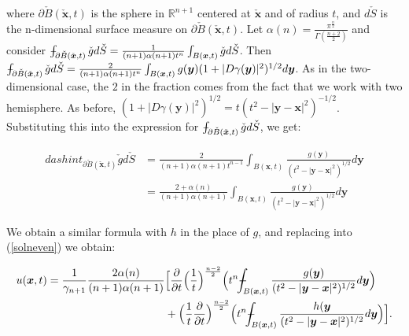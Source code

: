\documentclass[a4paper, 12pt]{article}
\def\Xint#1{\mathchoice
{\XXint\displaystyle\textstyle{#1}}%
{\XXint\textstyle\scriptstyle{#1}}%
{\XXint\scriptstyle\scriptscriptstyle{#1}}%
{\XXint\scriptscriptstyle\scriptscriptstyle{#1}}%
\!\int}
\def\XXint#1#2#3{{\setbox0=\hbox{$#1{#2#3}{\int}$ }
\vcenter{\hbox{$#2#3$ }}\kern-.6\wd0}}
\def\dashint{\Xint-}
\numberwithin{equation}{section}
\begin{document}
 where $\partial \check{B}(\boldsymbol{\check{x}},t)$ is the sphere in
 $\mathbb{R}^{n+1}$ centered at $\boldsymbol{\check{x}}$ and of radius $t$, and
 $d\check{S}$ is the n-dimensional surface measure on $\partial
 \check{B}(\boldsymbol{\check{x}},t)$. Let
 $\alpha(n)=\frac{\pi^{\frac{n}{2}}}{\Gamma(\frac{n+2}{2})}$ and consider
 $\dashint_{\partial \check{B}(\check{\boldsymbol{x}}, t)}
 \check{g}d\check{S}=\frac{1}{(n+1)\alpha(n+1)t^n}\int_{B(\boldsymbol{x},t)}\check{g}d\check{S}$.
 Then $\dashint_{\partial \check{B}(\check{\boldsymbol{x}}, t)}
 \check{g}d\check{S}=\frac{2}{(n+1)\alpha(n+1)t^n}\int_{B(\boldsymbol{x},t)}g(\boldsymbol{y})(1+|D\gamma(\boldsymbol{y})|^2)^{1/2}d\boldsymbol{y}$.
 As in the two-dimensional case, the $2$ in the fraction comes from the fact
 that we work with two hemisphere. As before, $(1+|D\gamma
 (\boldsymbol{y})|^2)^{1/2}=t(t^2-|\boldsymbol{y}-\boldsymbol{x}|^2)^{-1/2}$.
 Substituting this into the expression for $\dashint_{\partial
 \check{B}(\check{\boldsymbol{x}}, t)} \check{g}d\check{S}$, we get:

 \begin{equation*}
    \begin{aligned}
        dashint_{\partial \check{B}(\check{\boldsymbol{x}}, t)} \check{g}d\check{S}&=\frac{2}{(n+1)\alpha(n+1)t^{n-1}}\int_{B(\boldsymbol{x},t)}\frac{g(\boldsymbol{y})}{(t^2-|\boldsymbol{y}-\boldsymbol{x}|^2)^{1/2}}d\boldsymbol{y}\\
        &=\frac{2+\alpha(n)}{(n+1)\alpha(n+1)}\int_{B(\boldsymbol{x},t)}\frac{g(\boldsymbol{y})}{(t^2-|\boldsymbol{y}-\boldsymbol{x}|^2)^{1/2}}d \boldsymbol{y}
    \end{aligned}
\end{equation*}

We obtain a similar formula with $h$ in the place of $g$, and replacing into
(\ref{solneven}) we obtain:

\begin{equation*}
    \begin{split}
        u(\boldsymbol{x}, t)= \frac{1}{\gamma_{n+1}} \frac{2 \alpha(n)}{(n+1) \alpha (n+1)}&\Big[ \diffp[1]{}{t} \Big(\frac{1}{t} \Big)^{\frac{n-2}{2}} \Big(t^n \dashint_{B(\boldsymbol{x}, t)} \frac{g(\boldsymbol{y})}{(t^2-|\boldsymbol{y}-\boldsymbol{x}|^2)^{1/2}} d \boldsymbol{y} \Big)\\ 
        & +\Big(\frac{1}{t} \diffp[1]{}{t}\Big)^{\frac{n-2}{2}} \Big(t^n \dashint_{B(\boldsymbol{x},t)} \frac{h(\boldsymbol{y}}{(t^2-|\boldsymbol{y}-\boldsymbol{x}|^2)^{1/2}} d \boldsymbol{y} \Big) \Big].
    \end{split}
\end{equation*}
\end{document}
